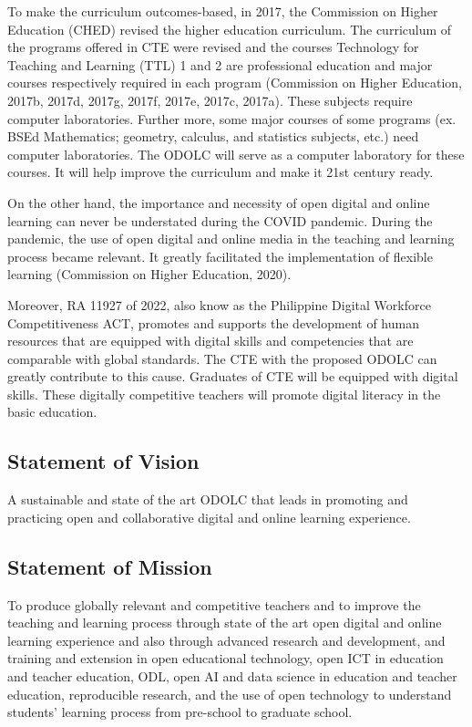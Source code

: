 \documentclass[
  12pt,
  foliopaper,
  DIV=11,
  numbers=noendperiod]{scrartcl}
\begin{document}
To make the curriculum outcomes-based, in 2017, the Commission on Higher
Education (CHED) revised the higher education curriculum. The curriculum
of the programs offered in CTE were revised and the courses Technology
for Teaching and Learning (TTL) 1 and 2 are professional education and
major courses respectively required in each program (Commission on
Higher Education, 2017b, 2017d, 2017g, 2017f, 2017e, 2017c, 2017a).
These subjects require computer laboratories. Further more, some major
courses of some programs (ex. BSEd Mathematics; geometry, calculus, and
statistics subjects, etc.) need computer laboratories. The ODOLC will
serve as a computer laboratory for these courses. It will help improve
the curriculum and make it 21st century ready.

On the other hand, the importance and necessity of open digital and
online learning can never be understated during the COVID pandemic.
During the pandemic, the use of open digital and online media in the
teaching and learning process became relevant. It greatly facilitated
the implementation of flexible learning (Commission on Higher Education,
2020).

Moreover, RA 11927 of 2022, also know as the Philippine Digital
Workforce Competitiveness ACT, promotes and supports the development of
human resources that are equipped with digital skills and competencies
that are comparable with global standards. The CTE with the proposed
ODOLC can greatly contribute to this cause. Graduates of CTE will be
equipped with digital skills. These digitally competitive teachers will
promote digital literacy in the basic education.

\hypertarget{statement-of-vision}{%
\subsection{Statement of Vision}\label{statement-of-vision}}

A sustainable and state of the art ODOLC that leads in promoting and
practicing open and collaborative digital and online learning
experience.

\hypertarget{statement-of-mission}{%
\subsection{Statement of Mission}\label{statement-of-mission}}

To produce globally relevant and competitive teachers and to improve the
teaching and learning process through state of the art open digital and
online learning experience and also through advanced research and
development, and training and extension in open educational technology,
open ICT in education and teacher education, ODL, open AI and data
science in education and teacher education, reproducible research, and
the use of open technology to understand students' learning process from
pre-school to graduate school.
\end{document}
